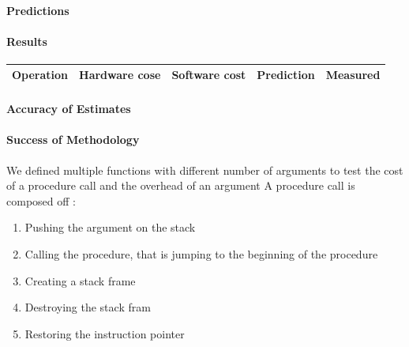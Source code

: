 \paragraph{Predictions}
\paragraph{Results}

\begin{tabular}{| l | l | l | l | l |}
\hline
Operation & Hardware cose & Software cost & Prediction & Measured \\
\hline
\end{tabular}
\paragraph{Accuracy of Estimates}
\paragraph{Success of Methodology}
We defined multiple functions with different number of arguments to test the
cost of a procedure call and the overhead of an argument
A procedure call is composed off :
\begin{enumerate}
\item Pushing the argument on the stack
\item Calling the procedure, that is jumping to the beginning of the procedure
\item Creating a stack frame
\item Destroying the stack fram
\item Restoring the instruction pointer
\end{enumerate}



